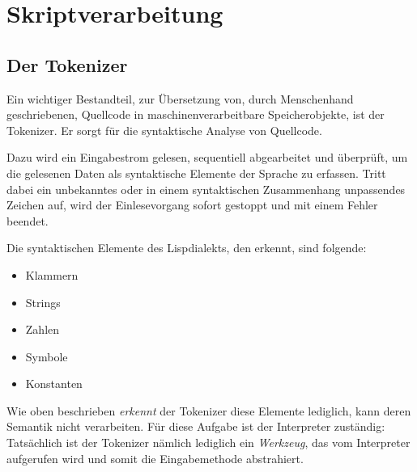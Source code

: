 \section{Skriptverarbeitung}

\subsection{Der Tokenizer}
\label{sec:tokenizer}

Ein wichtiger Bestandteil, zur Übersetzung von,
durch Menschenhand geschriebenen, Quellcode
in maschinenverarbeitbare Speicherobjekte, ist der Tokenizer. Er sorgt für die
syntaktische Analyse von Quellcode.

Dazu wird ein Eingabestrom gelesen, sequentiell abgearbeitet und überprüft,
um die gelesenen Daten als syntaktische Elemente der Sprache zu erfassen.
Tritt dabei ein
unbekanntes oder in einem syntaktischen Zusammenhang unpassendes Zeichen
auf, wird der Einlesevorgang sofort gestoppt und mit einem Fehler beendet.

Die syntaktischen Elemente des Lispdialekts, den \projectname{} erkennt,
sind folgende:

\begin{itemize}
\item{Klammern}
\item{Strings}
\item{Zahlen}
\item{Symbole}
\item{Konstanten}
\end{itemize}

Wie oben beschrieben \emph{erkennt} der Tokenizer diese Elemente lediglich,
kann deren Semantik nicht verarbeiten.
Für diese Aufgabe ist der Interpreter zuständig:
Tatsächlich ist der Tokenizer nämlich
lediglich ein \emph{Werkzeug}, das vom Interpreter aufgerufen wird und somit
die Eingabemethode abstrahiert.

